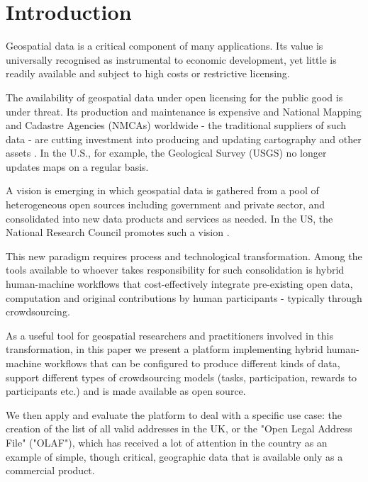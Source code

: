 \section{Introduction}

Geospatial data is a critical component of many applications. Its value is universally recognised as instrumental to economic development, yet little is readily available and subject to high costs or restrictive licensing. 

The availability of geospatial data under open licensing for the public good is under threat. Its production and maintenance is expensive and National Mapping and Cadastre Agencies (NMCAs) worldwide - the traditional suppliers of such data - are cutting investment into producing and updating cartography and other assets \cite{ESTES:1994vz}. In the U.S., for example, the Geological Survey (USGS) no longer updates maps on a regular basis. 

A vision is emerging in which geospatial data is gathered from a pool of heterogeneous open sources including government and private sector, and consolidated into new data products and services as needed. In the US, the National Research Council promotes such a vision \cite{Committee:1993vp}.

This new paradigm requires process and technological transformation. Among the tools available to whoever takes responsibility for such consolidation is hybrid human-machine workflows that cost-effectively integrate pre-existing open data, computation and original contributions by human participants - typically through crowdsourcing. 

As a useful tool for geospatial researchers and practitioners involved in this transformation, in this paper we present a platform implementing hybrid human-machine workflows that can be configured to produce different kinds of data, support different types of crowdsourcing models (tasks, participation, rewards to participants etc.) and is made available as open source. 

We then apply and evaluate the platform to deal with a specific use case: the creation of the list of all valid addresses in the UK, or the "Open Legal Address File" ("OLAF"), which has received a lot of attention in the country as an example of simple, though critical, geographic data that is available only as a commercial product.

